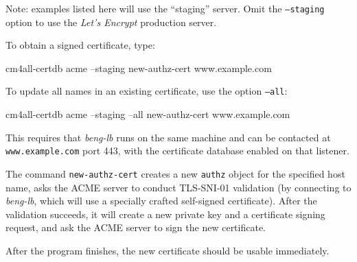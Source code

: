 \documentclass[a4paper,12pt]{article}
\begin{document}
\small{Note: examples listed here will use the ``staging'' server.
  Omit the \texttt{--staging} option to use the \emph{Let's Encrypt}
  production server.}

To obtain a signed certificate, type:

\begin{verbatim*}
cm4all-certdb acme --staging new-authz-cert www.example.com
\end{verbatim*}

To update all names in an existing certificate, use the option
\texttt{--all}:

\begin{verbatim*}
cm4all-certdb acme --staging --all new-authz-cert www.example.com
\end{verbatim*}

This requires that \emph{beng-lb} runs on the same machine and can be
contacted at \texttt{www.example.com} port 443, with the certificate
database enabled on that listener.

The command \texttt{new-authz-cert} creates a new \texttt{authz}
object for the specified host name, asks the ACME server to conduct
TLS-SNI-01 validation (by connecting to \emph{beng-lb}, which will use
a specially crafted self-signed certificate).  After the validation
succeeds, it will create a new private key and a certificate signing
request, and ask the ACME server to sign the new certificate.

After the program finishes, the new certificate should be usable
immediately.
\end{document}
